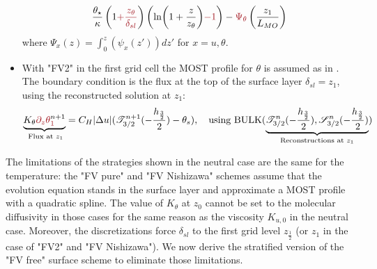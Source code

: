 \begin{itemize}
\begin{equation}
\begin{aligned}
			\frac{\theta_\star}{\kappa}
			\left(1\emphase{+\frac{z_\theta}
					{\delta_{sl}}}\right)
		\left(\ln(1+\frac{z}{z_\theta})\emphase{-1}\right)
		- \emphase{\Psi_\theta}\left(\frac{z_1}{L_{MO}}\right)
		\end{aligned}
		\end{equation}
		where $\Psi_x(z) = \int_0^z (\psi_x(z'))dz'$
		for $x=u,\theta$.
	\item With "FV2" in the first grid cell
		the MOST profile for $\theta$ is assumed as in
		\cite{nishizawa_surface_2018}.
		The boundary condition is the flux at the top of the
		surface layer $\delta_{sl}=z_1$,
		using the reconstructed solution at $z_1$:
		\begin{equation}
			\underbrace{K_\theta
			\emphase{\partial_z \theta}^{n+1}_\emphase{1}}_{\text{
				Flux at
			} z_1} =
			C_H|\Delta u|(
			{\cal T}_{3/2}^{n+1}
			(-\frac{h_\frac{3}{2}}{2}) - \theta_s),
			~~~ \text{using } {\rm BULK}
			(\underbrace{{\cal T}_{3/2}^{n}
			(-\frac{h_\frac{3}{2}}{2}),
			{\cal S}_{3/2}^{n}
			(-\frac{h_\frac{3}{2}}{2})}_{
			\text{Reconstructions at } z_1 })
		\end{equation}
\end{itemize}
The limitations of the strategies shown in the neutral case are the
same for the temperature: the "FV pure" and "FV Nishizawa" schemes
assume that the evolution equation stands
in the surface layer and approximate a MOST profile with
a quadratic spline.
The value of $K_\theta$ at $z_0$ cannot be set to the molecular
diffusivity in those cases for the same reason as the
viscosity $K_{u,0}$ in the neutral case.
%
Moreover, the discretizations force $\delta_{sl}$ to the first
grid level $z_{\frac{1}{2}}$ (or $z_1$ in the case of "FV2" and
"FV Nishizawa").
We now derive the stratified version of the "FV free" surface scheme
to eliminate those limitations.
